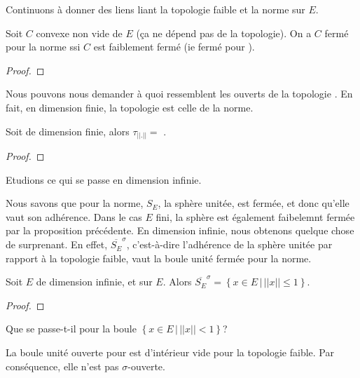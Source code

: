Continuons à donner des liens liant la topologie faible et la norme sur $E$.

\begin{proposition}
	Soit $C$ convexe non vide de $E$ (ça ne dépend pas de la topologie).
	On a $C$ fermé pour la norme ssi $C$ est faiblement fermé (ie fermé pour
	).
\end{proposition}

\begin{proof}
	
\end{proof}

Nous pouvons nous demander à quoi ressemblent les ouverts de la topologie
. En fait, en dimension finie, la topologie est celle de la norme.

\begin{proposition}
	Soit  de dimension finie, alors $\tau_{||.||}
	=$ .
\end{proposition}

\begin{proof}
	
\end{proof}

Etudions ce qui se passe en dimension infinie.

Nous savons que pour la norme, $S_{E}$, la sphère unitée, est fermée, et donc
qu'elle vaut son adhérence.  Dans le cas $E$ fini, la sphère est également
faibelemnt fermée par la proposition précédente. En dimension infinie, nous
obtenons quelque chose de surprenant. En effet, $\overline{S_{E}}^{\sigma}$,
c'est-à-dire l'adhérence de la sphère unitée par rapport à la topologie faible,
vaut la boule unité fermée pour la norme.

\begin{proposition}
	Soit $E$ de dimension infinie, et  sur $E$. Alors
	$\overline{S_{E}}^{\sigma} = \left\{ x \in E \, | \, ||x|| \leq 1 \right\}$.
\end{proposition}

\begin{proof}
	
\end{proof}

Que se passe-t-il pour la boule $\left\{ x \in E \, | \, ||x|| < 1 \right\}$?

\begin{proposition}
	La boule unité ouverte pour  est d'intérieur vide pour la
	topologie faible. Par conséquence, elle n'est pas $\sigma$-ouverte.
\end{proposition}

